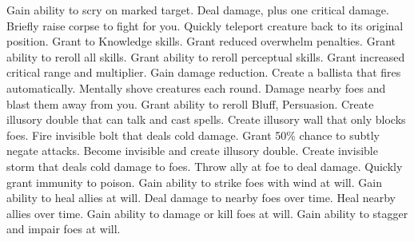     {Gain ability to scry on marked target.}
    {Deal damage, plus one critical damage.}
    {Briefly raise corpse to fight for you.}
    {Quickly teleport creature back to its original position.}
    {Grant  to Knowledge skills.}
    {Grant reduced overwhelm penalties.}
    {Grant ability to reroll all skills.}
    {Grant ability to reroll perceptual skills.}
    {Grant increased critical range and multiplier.}
    {Gain damage reduction.}
    {Create a ballista that fires automatically.}
    {Mentally shove creatures each round.}
    {Damage nearby foes and blast them away from you.}
    {Grant ability to reroll Bluff, Persuasion.}
    {Create illusory double that can talk and cast spells.}
    {Create illusory wall that only blocks foes.}
    {Fire invisible bolt that deals cold damage.}
    {Grant 50\% chance to subtly negate attacks.}
    {Become invisible and create illusory double.}
    {Create invisible storm that deals cold damage to foes.}
    {Throw ally at foe to deal damage.}
    {Quickly grant immunity to poison.}
    {Gain ability to strike foes with wind at will.}
    {Gain ability to heal allies at will.}
    {Deal damage to nearby foes over time.}
    {Heal nearby allies over time.}
    {Gain ability to damage or kill foes at will.}
    {Gain ability to stagger and impair foes at will.}
